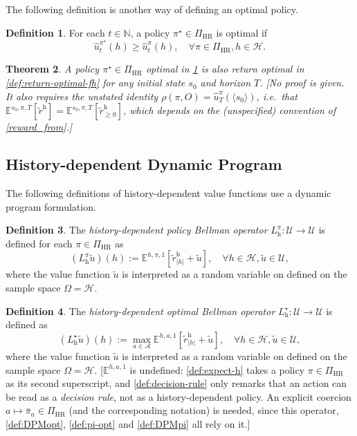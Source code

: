 \documentclass[letterpaper]{article}
\theoremstyle{plain}
\newtheorem{theorem}{Theorem}[subsection]
\theoremstyle{definition}
\newtheorem{definition}[theorem]{Definition}
\theoremstyle{remark}
\newcommand{\Nats}{\mathbb{N}}
\newcommand{\E}{\mathbb{E}}
\newcommand{\opt}{^{\star}}
\newcommand{\PiHR}{\Pi_{\mathrm{HR}}}
\newcommand{\rew}{\tilde{r}^{\mathrm{h}}}
\newcommand{\cc}[1]{\textcolor{ccolor}{[#1]}}
\newcommand{\lean}[1]{\textcolor{blue}{(\emph{LEAN}: \texttt{#1})}}
\newcommand{\leanok}{}
\begin{document}
The following definition is another way of defining an optimal policy.
\begin{definition} \label{def:optimal-fh}
For each $t\in \Nats$, a policy $\pi\opt \in \PiHR$ is optimal if
\[
   \hat{u}_t^{\pi\opt}(h) \ge \hat{u}_t^{\pi}(h), \quad \forall \pi \in \PiHR, h\in \mathcal{H}.
 \]
\end{definition}

\begin{theorem} \label{def:optimalvf-imp-optimal}
A policy $\pi\opt \in \PiHR$ optimal in \cref{def:optimal-fh} is also return optimal in \cref{def:return-optimal-fh} for any initial state $s_0$ and horizon $T$.
\cc{No proof is given. It also requires the unstated identity $\rho(\pi,O) = \hat{u}^{\pi}_T(\langle s_0\rangle)$, i.e.\ that $\E^{s_0,\pi,T}[\rew] = \E^{s_0,\pi,T}[\rew_{\ge 0}]$, which depends on the (unspecified) convention of \cref{reward_from}.}
\end{theorem}

\subsection{History-dependent Dynamic Program}

The following definitions of history-dependent value functions use a dynamic program formulation.

\begin{definition} \label{def:DPhpi}
The \emph{history-dependent policy Bellman operator} $L_{\mathrm{h}}^{\pi} \colon \mathcal{U} \to \mathcal{U}$ is defined for each $\pi\in \PiHR$ as
  \[
    (L_{\mathrm{h}}^{\pi} \tilde{u}) (h)
    :=
    \E^{h, \pi, 1} \left[ \rew_{|h|} + \tilde{u} \right], \quad \forall h\in \mathcal{H}, \tilde{u} \in \mathcal{U},
  \]
  where the value function $\tilde{u}$ is interpreted as a random variable on defined on the sample space $\Omega = \mathcal{H}$.
\end{definition}

\begin{definition}\label{def:DPhopt} 
The \emph{history-dependent optimal Bellman operator} $L_{\mathrm{h}}\opt \colon \mathcal{U} \to \mathcal{U}$ is defined as
  \[
    (L\opt_{\mathrm{h}} \tilde{u}) (h)
    :=
    \max_{a\in \mathcal{A}} \E^{h, a, 1} \left[ \rew_{|h|} + \tilde{u} \right], \quad \forall h\in \mathcal{H}, \tilde{u} \in \mathcal{U},
  \]
  where the value function $\tilde{u}$ is interpreted as a random variable on defined on the sample space $\Omega = \mathcal{H}$.
  \cc{$\E^{h,a,1}$ is undefined: \cref{def:expect-h} takes a policy $\pi\in \PiHR$ as its second superscript, and \cref{def:decision-rule} only remarks that an action can be read as a \emph{decision rule}, not as a history-dependent policy. An explicit coercion $a \mapsto \bar{\pi}_a \in \PiHR$ (and the corresponding notation) is needed, since this operator, \cref{def:DPMopt}, \cref{def:pi-opt} and \cref{def:DPMpi} all rely on it.}
\end{definition}
\end{document}
